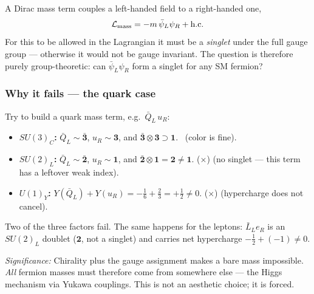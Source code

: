 A Dirac mass term couples a left-handed field to a right-handed one,
\begin{equation}
  \mathcal{L}_{\rm mass} = -m\,\bar\psi_L\psi_R + \text{h.c.}
  \label{eq:lec20:diracmass}
\end{equation}
For this to be allowed in the Lagrangian it must be a \emph{singlet}
under the full gauge group --- otherwise it would not be gauge
invariant. The question is therefore purely group-theoretic: can
$\bar\psi_L\psi_R$ form a singlet for any SM fermion?


\subsubsection*{Why it fails --- the quark case}

Try to build a quark mass term, e.g.\ $\bar Q_L\,u_R$:
\begin{itemize}
  \item \textbf{$SU(3)_C$:} $\bar Q_L\sim\bar{\mathbf3}$,
        $u_R\sim\mathbf3$, and $\bar{\mathbf3}\otimes\mathbf3\supset\mathbf1$.
        \checkmark\ (color is fine).
  \item \textbf{$SU(2)_L$:} $\bar Q_L\sim\bar{\mathbf2}$, $u_R\sim\mathbf1$,
        and $\bar{\mathbf2}\otimes\mathbf1 = \mathbf2\neq\mathbf1$.
        ($\boldsymbol\times$) (no singlet --- this term has a leftover weak index).
  \item \textbf{$U(1)_Y$:} $Y(\bar Q_L)+Y(u_R) = -\tfrac16+\tfrac23
        = +\tfrac12\neq 0$. ($\boldsymbol\times$) (hypercharge does not cancel).
\end{itemize}
Two of the three factors fail. The same happens for the leptons:
$\bar L_L e_R$ is an $SU(2)_L$ doublet ($\mathbf2$, not a singlet) and
carries net hypercharge $-\tfrac12+(-1)\neq0$.

\textit{Significance:} Chirality plus the gauge assignment makes a bare
mass impossible. \emph{All} fermion masses must therefore come from
somewhere else --- the Higgs mechanism via Yukawa couplings. This is
not an aesthetic choice; it is forced.


